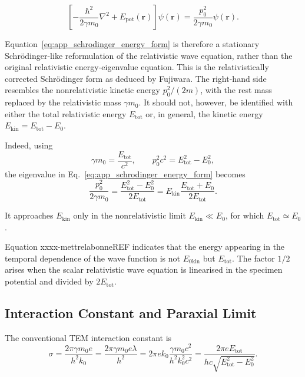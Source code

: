\documentclass[12pt]{article}
\begin{document}
\begin{equation}
\left[
-\frac{\hbar^2}{2\gamma m_0}\nabla^2
+
E_{\mathrm{pot}}(\mathbf r)
\right]\psi(\mathbf r)
=
\frac{p_0^2}{2\gamma m_0}\psi(\mathbf r).
\label{eq:app_schrodinger_energy_form}
\end{equation}

Equation~\eqref{eq:app_schrodinger_energy_form} is
therefore a stationary Schrödinger-like reformulation of the relativistic
wave equation, rather than the original relativistic energy-eigenvalue
equation.
This is the relativistically corrected
Schr\"odinger form as deduced by Fujiwara. 
The right-hand side resembles the nonrelativistic kinetic energy
$p_0^2/(2m)$, with the rest mass replaced by the relativistic mass
$\gamma m_0$. It should not, however, be identified with either the total
relativistic energy $E_{\mathrm{tot}}$ or, in general, the kinetic energy
$E_{\mathrm{kin}}=E_{\mathrm{tot}}-E_0$.

Indeed, using
\begin{equation}
\gamma m_0=\frac{E_{\mathrm{tot}}}{c^2},
\qquad
p_0^2c^2=E_{\mathrm{tot}}^2-E_0^2,
\end{equation}
the eigenvalue in Eq.~\eqref{eq:app_schrodinger_energy_form} becomes
\begin{equation}
\frac{p_0^2}{2\gamma m_0}
=
\frac{E_{\mathrm{tot}}^2-E_0^2}{2E_{\mathrm{tot}}}
=
E_{\mathrm{kin}}\frac{E_{\mathrm{tot}}+E_0}{2E_{\mathrm{tot}}}.
\label{eq:app_effective_schrodinger_eigenvalue}
\end{equation}

It approaches $E_{\mathrm{kin}}$ only in the nonrelativistic limit
$E_{\mathrm{kin}}\ll E_0$, for which $E_{\mathrm{tot}}\simeq E_0$.

Equation  xxxx-mettrelabonneREF indicates that the energy appearing in the temporal dependence of the wave function is not $E_{0\mathrm{kin}}$ but $E_{\mathrm{tot}}$. 
The factor $1/2$ arises when the scalar relativistic wave equation is
linearised in the specimen potential and divided by
$2E_{\mathrm{tot}}$. 

\subsection{Interaction Constant and Paraxial Limit}

The conventional TEM interaction constant is
\begin{equation}
\sigma
=
\frac{2\pi\gamma m_0e}{h^2k_0}
=
\frac{2\pi\gamma m_0e\lambda}{h^2}= 2 \pi e  k_0 \frac{\gamma m_0 c^2}{h^2 k_0^2 c^2}=
\frac{2\pi e E_{\mathrm{tot}}}
{hc\sqrt{E_{\mathrm{tot}}^2-E_0^2}}.
\label{eq:app_sigma_definition}
\end{equation}
\end{document}
